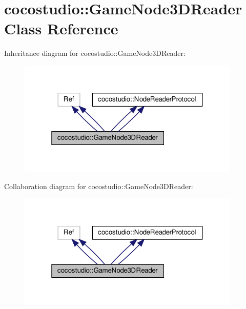 \hypertarget{classcocostudio_1_1GameNode3DReader}{}\section{cocostudio\+:\+:Game\+Node3\+D\+Reader Class Reference}
\label{classcocostudio_1_1GameNode3DReader}


Inheritance diagram for cocostudio\+:\+:Game\+Node3\+D\+Reader\+:
\nopagebreak
\begin{figure}[H]
\begin{center}
\leavevmode
\includegraphics[width=301pt]{classcocostudio_1_1GameNode3DReader__inherit__graph}
\end{center}
\end{figure}


Collaboration diagram for cocostudio\+:\+:Game\+Node3\+D\+Reader\+:
\nopagebreak
\begin{figure}[H]
\begin{center}
\leavevmode
\includegraphics[width=301pt]{classcocostudio_1_1GameNode3DReader__coll__graph}
\end{center}
\end{figure}
